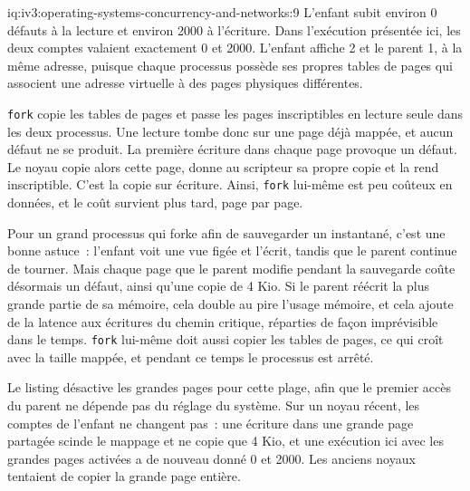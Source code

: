\begin{solution}{iq:iv3:operating-systems-concurrency-and-networks:9}
L'enfant subit environ 0 défauts à la lecture et environ 2000 à l'écriture. Dans l'exécution présentée ici, les deux comptes valaient exactement 0 et 2000. L'enfant affiche 2 et le parent 1, à la même adresse, puisque chaque processus possède ses propres tables de pages qui associent une adresse virtuelle à des pages physiques différentes.

\texttt{fork} copie les tables de pages et passe les pages inscriptibles en lecture seule dans les deux processus. Une lecture tombe donc sur une page déjà mappée, et aucun défaut ne se produit. La première écriture dans chaque page provoque un défaut. Le noyau copie alors cette page, donne au scripteur sa propre copie et la rend inscriptible. C'est la copie sur écriture. Ainsi, \texttt{fork} lui-même est peu coûteux en données, et le coût survient plus tard, page par page.

Pour un grand processus qui forke afin de sauvegarder un instantané, c'est une bonne astuce~: l'enfant voit une vue figée et l'écrit, tandis que le parent continue de tourner. Mais chaque page que le parent modifie pendant la sauvegarde coûte désormais un défaut, ainsi qu'une copie de 4 Kio. Si le parent réécrit la plus grande partie de sa mémoire, cela double au pire l'usage mémoire, et cela ajoute de la latence aux écritures du chemin critique, réparties de façon imprévisible dans le temps. \texttt{fork} lui-même doit aussi copier les tables de pages, ce qui croît avec la taille mappée, et pendant ce temps le processus est arrêté.

Le listing désactive les grandes pages pour cette plage, afin que le premier accès du parent ne dépende pas du réglage du système. Sur un noyau récent, les comptes de l'enfant ne changent pas~: une écriture dans une grande page partagée scinde le mappage et ne copie que 4 Kio, et une exécution ici avec les grandes pages activées a de nouveau donné 0 et 2000. Les anciens noyaux tentaient de copier la grande page entière.

\end{solution}

